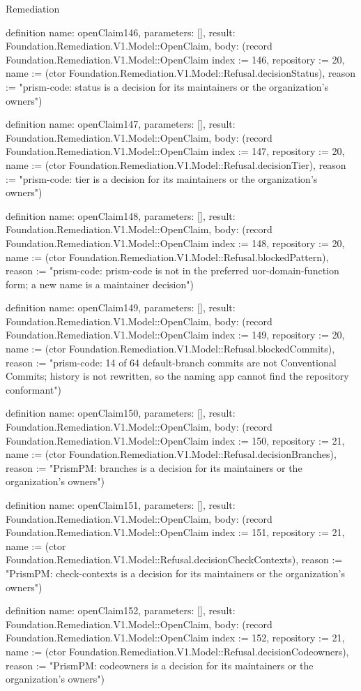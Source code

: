 \begin{lexlean}{Remediation}
\begin{semanticmodule}
definition{
  name: openClaim146,
  parameters: [],
  result: Foundation.Remediation.V1.Model::OpenClaim,
  body: (record Foundation.Remediation.V1.Model::OpenClaim {index := 146, repository := 20, name := (ctor Foundation.Remediation.V1.Model::Refusal.decisionStatus), reason := "prism-code: status is a decision for its maintainers or the organization's owners"})
}

definition{
  name: openClaim147,
  parameters: [],
  result: Foundation.Remediation.V1.Model::OpenClaim,
  body: (record Foundation.Remediation.V1.Model::OpenClaim {index := 147, repository := 20, name := (ctor Foundation.Remediation.V1.Model::Refusal.decisionTier), reason := "prism-code: tier is a decision for its maintainers or the organization's owners"})
}

definition{
  name: openClaim148,
  parameters: [],
  result: Foundation.Remediation.V1.Model::OpenClaim,
  body: (record Foundation.Remediation.V1.Model::OpenClaim {index := 148, repository := 20, name := (ctor Foundation.Remediation.V1.Model::Refusal.blockedPattern), reason := "prism-code: prism-code is not in the preferred uor-{domain}-{function} form; a new name is a maintainer decision"})
}

definition{
  name: openClaim149,
  parameters: [],
  result: Foundation.Remediation.V1.Model::OpenClaim,
  body: (record Foundation.Remediation.V1.Model::OpenClaim {index := 149, repository := 20, name := (ctor Foundation.Remediation.V1.Model::Refusal.blockedCommits), reason := "prism-code: 14 of 64 default-branch commits are not Conventional Commits; history is not rewritten, so the naming app cannot find the repository conformant"})
}

definition{
  name: openClaim150,
  parameters: [],
  result: Foundation.Remediation.V1.Model::OpenClaim,
  body: (record Foundation.Remediation.V1.Model::OpenClaim {index := 150, repository := 21, name := (ctor Foundation.Remediation.V1.Model::Refusal.decisionBranches), reason := "PrismPM: branches is a decision for its maintainers or the organization's owners"})
}

definition{
  name: openClaim151,
  parameters: [],
  result: Foundation.Remediation.V1.Model::OpenClaim,
  body: (record Foundation.Remediation.V1.Model::OpenClaim {index := 151, repository := 21, name := (ctor Foundation.Remediation.V1.Model::Refusal.decisionCheckContexts), reason := "PrismPM: check-contexts is a decision for its maintainers or the organization's owners"})
}

definition{
  name: openClaim152,
  parameters: [],
  result: Foundation.Remediation.V1.Model::OpenClaim,
  body: (record Foundation.Remediation.V1.Model::OpenClaim {index := 152, repository := 21, name := (ctor Foundation.Remediation.V1.Model::Refusal.decisionCodeowners), reason := "PrismPM: codeowners is a decision for its maintainers or the organization's owners"})
}


\end{semanticmodule}
\end{lexlean}
